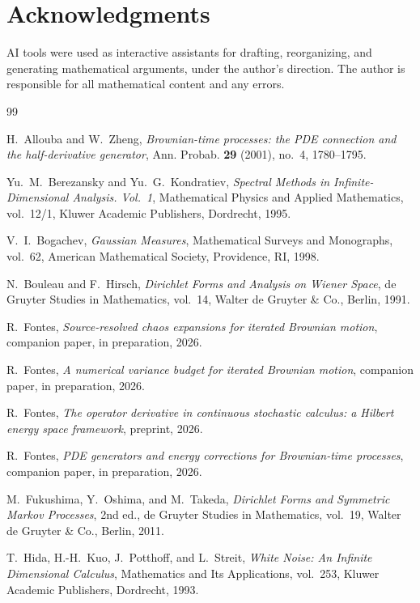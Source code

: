 \documentclass[11pt,reqno]{amsart}
\theoremstyle{plain}
\theoremstyle{definition}
\theoremstyle{remark}
\begin{document}
\section*{Acknowledgments}

AI tools were used as interactive assistants for drafting,
reorganizing, and generating mathematical arguments, under the
author's direction. The author is responsible for all mathematical
content and any errors.

\begin{thebibliography}{99}

H.~Allouba and W.~Zheng,
\emph{Brownian-time processes: the PDE connection and the
half-derivative generator},
Ann. Probab. \textbf{29} (2001), no.~4, 1780--1795.

Yu.~M.~Berezansky and Yu.~G.~Kondratiev,
\emph{Spectral Methods in Infinite-Dimensional Analysis. Vol.~1},
Mathematical Physics and Applied Mathematics, vol.~12/1,
Kluwer Academic Publishers, Dordrecht, 1995.

V.~I.~Bogachev,
\emph{Gaussian Measures},
Mathematical Surveys and Monographs, vol.~62,
American Mathematical Society, Providence, RI, 1998.

N.~Bouleau and F.~Hirsch,
\emph{Dirichlet Forms and Analysis on Wiener Space},
de Gruyter Studies in Mathematics, vol.~14,
Walter de Gruyter \& Co., Berlin, 1991.

R.~Fontes,
\emph{Source-resolved chaos expansions for iterated Brownian motion},
companion paper, in preparation, 2026.

R.~Fontes,
\emph{A numerical variance budget for iterated Brownian motion},
companion paper, in preparation, 2026.

R.~Fontes,
\emph{The operator derivative in continuous stochastic calculus:
a Hilbert energy space framework},
preprint, 2026.

R.~Fontes,
\emph{PDE generators and energy corrections for Brownian-time processes},
companion paper, in preparation, 2026.

M.~Fukushima, Y.~Oshima, and M.~Takeda,
\emph{Dirichlet Forms and Symmetric Markov Processes},
2nd ed., de Gruyter Studies in Mathematics, vol.~19,
Walter de Gruyter \& Co., Berlin, 2011.

T.~Hida, H.-H.~Kuo, J.~Potthoff, and L.~Streit,
\emph{White Noise: An Infinite Dimensional Calculus},
Mathematics and Its Applications, vol.~253,
Kluwer Academic Publishers, Dordrecht, 1993.


\end{thebibliography}
\end{document}
